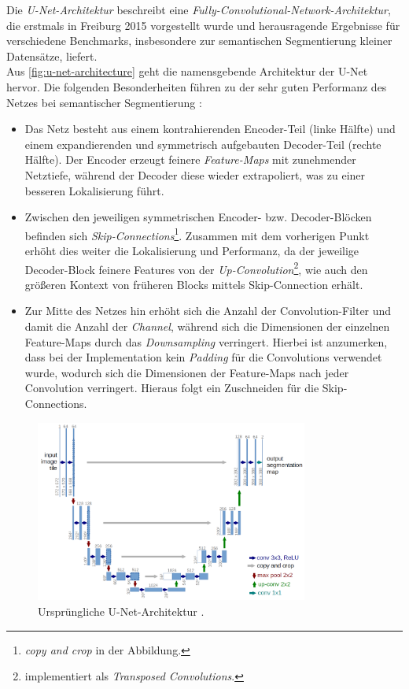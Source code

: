 Die \textit{U-Net-Architektur} beschreibt eine \textit{Fully-Convolutional-Network-Architektur}, die erstmals in Freiburg 2015 vorgestellt wurde 
und herausragende Ergebnisse für verschiedene Benchmarks, insbesondere zur semantischen Segmentierung kleiner Datensätze, liefert. \\
Aus \autoref{fig:u-net-architecture} geht die namensgebende Architektur der U-Net hervor. Die folgenden Besonderheiten 
führen zu der sehr guten Performanz des Netzes bei semantischer Segmentierung \cite{Ronneberger.18052015}:
\begin{itemize}
	\item Das Netz besteht aus einem kontrahierenden Encoder-Teil (linke Hälfte) und einem expandierenden und symmetrisch aufgebauten
	Decoder-Teil (rechte Hälfte). Der Encoder erzeugt feinere \textit{Feature-Maps} mit zunehmender Netztiefe, 
	während der Decoder diese wieder extrapoliert, was zu einer besseren Lokalisierung führt. 
	\item Zwischen den jeweiligen symmetrischen Encoder- bzw. Decoder-Blöcken befinden sich \textit{Skip-Connections}\footnote{\textit{copy and crop} in der Abbildung.}.
	Zusammen mit dem vorherigen Punkt erhöht dies weiter die Lokalisierung und Performanz, da der jeweilige Decoder-Block feinere Features von der \textit{Up-Convolution}\footnote{implementiert als \textit{Transposed Convolutions}.},
	wie auch den größeren Kontext von früheren Blocks mittels Skip-Connection erhält. 
	\item Zur Mitte des Netzes hin erhöht sich die Anzahl der Convolution-Filter und damit die Anzahl der \textit{Channel}, 
	während sich die Dimensionen der einzelnen Feature-Maps durch das \textit{Downsampling} verringert. 
	Hierbei ist anzumerken, dass bei der Implementation kein \textit{Padding} für die Convolutions verwendet wurde,
	wodurch sich die Dimensionen der Feature-Maps nach jeder Convolution verringert. 
	Hieraus folgt ein Zuschneiden für die Skip-Connections. 
\end{itemize}

\begin{figure}
	\centering
	\includegraphics[width=0.8\textwidth]{Bilder/u-net-architecture.png} 
	\caption{Ursprüngliche U-Net-Architektur \cite{Ronneberger.18052015}.}
	\label{fig:u-net-architecture}
\end{figure} 


